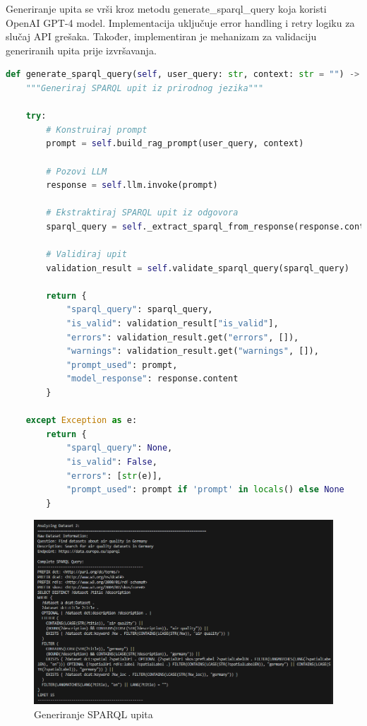 Generiranje upita se vrši kroz metodu generate\_sparql\_query koja koristi OpenAI GPT-4 model. Implementacija uključuje error handling i retry logiku za slučaj API grešaka. Također, implementiran je mehanizam za validaciju generiranih upita prije izvršavanja.

\begin{lstlisting}[language=Python, caption=Implementacija generiranja SPARQL upita]
def generate_sparql_query(self, user_query: str, context: str = "") -> Dict[str, Any]:
    """Generiraj SPARQL upit iz prirodnog jezika"""
    
    try:
        # Konstruiraj prompt
        prompt = self.build_rag_prompt(user_query, context)
        
        # Pozovi LLM
        response = self.llm.invoke(prompt)
        
        # Ekstraktiraj SPARQL upit iz odgovora
        sparql_query = self._extract_sparql_from_response(response.content)
        
        # Validiraj upit
        validation_result = self.validate_sparql_query(sparql_query)
        
        return {
            "sparql_query": sparql_query,
            "is_valid": validation_result["is_valid"],
            "errors": validation_result.get("errors", []),
            "warnings": validation_result.get("warnings", []),
            "prompt_used": prompt,
            "model_response": response.content
        }
        
    except Exception as e:
        return {
            "sparql_query": None,
            "is_valid": False,
            "errors": [str(e)],
            "prompt_used": prompt if 'prompt' in locals() else None
        }
\end{lstlisting}

\begin{figure}[htbp]
    \centering
    \includegraphics[width=1\textwidth]{figures/izvjestaj_image_53.png}
    \caption{Generiranje SPARQL upita}
    \label{fig:unified_data_assistant}
\end{figure}

